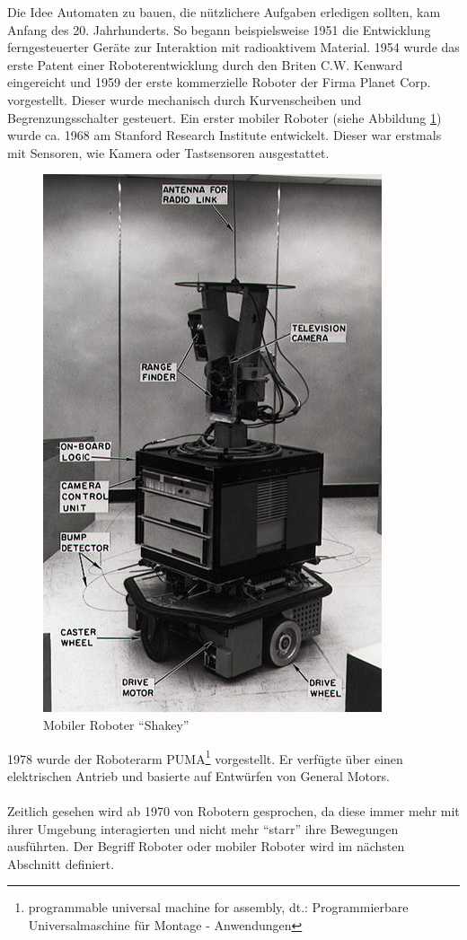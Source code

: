 Die Idee Automaten zu bauen, die nützlichere Aufgaben erledigen sollten, kam Anfang des 20. Jahrhunderts. So begann beispielsweise 1951 die Entwicklung ferngesteuerter Geräte zur Interaktion mit radioaktivem Material. 1954 wurde das erste Patent einer Roboterentwicklung durch den Briten C.W. Kenward eingereicht und 1959 der erste kommerzielle Roboter der Firma Planet Corp. vorgestellt. Dieser wurde mechanisch durch Kurvenscheiben und Begrenzungsschalter gesteuert. Ein erster mobiler Roboter (siehe Abbildung \ref{f:shakey}) wurde ca. 1968 am Stanford Research Institute entwickelt. Dieser war erstmals mit Sensoren, wie Kamera oder Tastsensoren ausgestattet.
\begin{figure}[H]						
	\centering							
	\includegraphics[scale=1]{Bilder/shakey.jpg}			
	\caption{Mobiler Roboter "`Shakey"'}						
	\label{f:shakey}						
\end{figure}
1978 wurde der Roboterarm PUMA\footnote{programmable universal machine for assembly, dt.: Programmierbare Universalmaschine für Montage - Anwendungen} vorgestellt. Er verfügte über einen elektrischen Antrieb und basierte auf Entwürfen von General Motors.
\\
\\
Zeitlich gesehen wird ab 1970 von Robotern gesprochen, da diese immer mehr mit ihrer Umgebung interagierten und nicht mehr "`starr"' ihre Bewegungen ausführten. Der Begriff Roboter oder mobiler Roboter wird im nächsten Abschnitt definiert.
 
